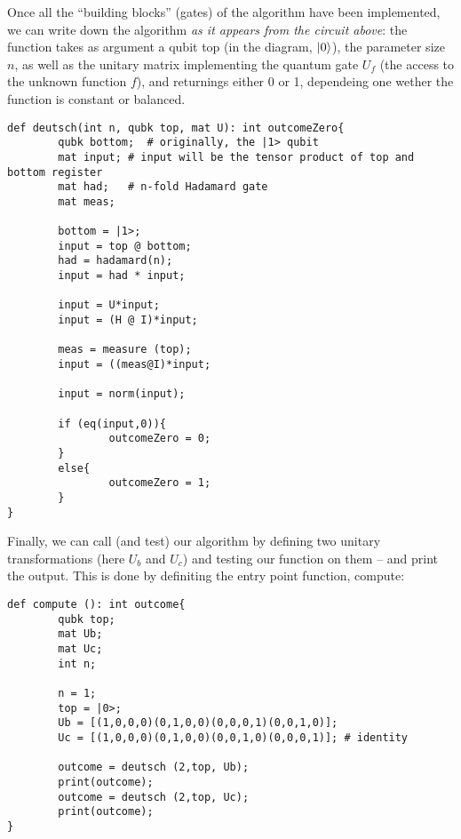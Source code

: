 Once all the ``building blocks'' (gates) of the algorithm have been implemented, we can write down the algorithm \emph{as it appears from the circuit above}: the function takes as argument a qubit \textsf{top} (in the diagram, $|0\rangle$), the parameter size $n$, as well as the unitary matrix implementing the quantum  gate $U_f$ (the access to the unknown function $f$), and returnings either 0 or 1, dependeing one wether the function is constant or balanced.
\begin{lstlisting}
def deutsch(int n, qubk top, mat U): int outcomeZero{       
        qubk bottom;  # originally, the |1> qubit    
        mat input; # input will be the tensor product of top and bottom register  
        mat had;   # n-fold Hadamard gate  
        mat meas;

        bottom = |1>;
        input = top @ bottom;
        had = hadamard(n);
        input = had * input;
        
        input = U*input;
        input = (H @ I)*input;
        
        meas = measure (top);        
        input = ((meas@I)*input;
        
        input = norm(input);
        
        if (eq(input,0)){
                outcomeZero = 0;
        }
        else{
                outcomeZero = 1;
        }
}
\end{lstlisting}

Finally, we can call (and test) our algorithm by defining two unitary transformations (here $U_b$ and $U_c$) and testing our function on them -- and print the output. This is done by definiting the entry point function, \textsf{compute}:
\begin{lstlisting}
def compute (): int outcome{
        qubk top;
        mat Ub;
        mat Uc;
        int n;
        
        n = 1;
        top = |0>;
        Ub = [(1,0,0,0)(0,1,0,0)(0,0,0,1)(0,0,1,0)];
        Uc = [(1,0,0,0)(0,1,0,0)(0,0,1,0)(0,0,0,1)]; # identity

        outcome = deutsch (2,top, Ub);
        print(outcome);
        outcome = deutsch (2,top, Uc);
        print(outcome);
}
\end{lstlisting}
%
